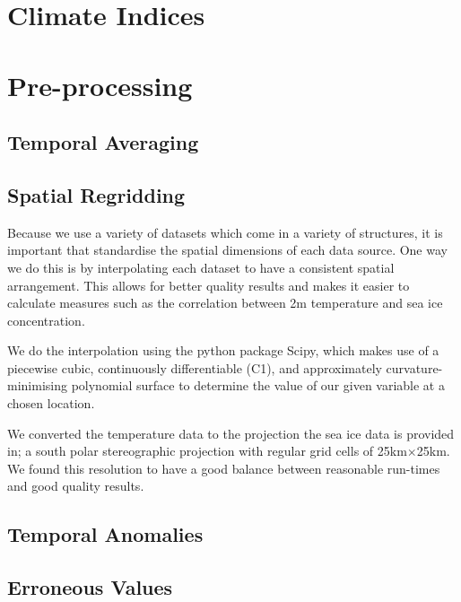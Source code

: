 \documentclass[../main.tex]{subfiles}
\begin{document}
\section{Climate Indices}

\section{Pre-processing}
\subsection*{Temporal Averaging}
\subsection*{Spatial Regridding}
Because we use a variety of datasets which come in a variety of structures, it is important that standardise the spatial dimensions of each data source. One way we do this is by interpolating each dataset to have a consistent spatial arrangement. This allows for better quality results and makes it easier to calculate measures such as the correlation between 2m temperature and sea ice concentration.

We do the interpolation using the python package Scipy, which makes use of a piecewise cubic, continuously differentiable (C1), and approximately curvature-minimising polynomial surface to determine the value of our given variable at a chosen location. 

We converted the temperature data to the projection the sea ice data is provided in; a south polar stereographic projection with regular grid cells of 25km$\times$25km. We found this resolution to have a good balance between reasonable run-times and good quality results.

\subsection*{Temporal Anomalies}
\subsection*{Erroneous Values}
\end{document}
